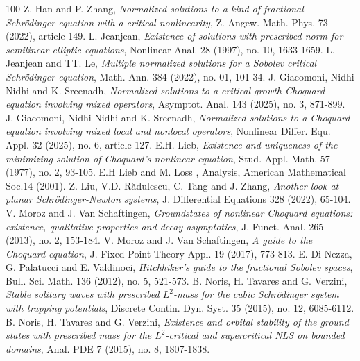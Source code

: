 \documentclass[11pt]{article}
\numberwithin{equation}{section}
\numberwithin{mytheorem}{section}
\begin{document}
\begin{thebibliography}{100}
					 Z. Han and P. Zhang, {\it Normalized solutions to a kind of fractional Schrödinger equation with a critical nonlinearity}, Z. Angew. Math. Phys. 73 (2022), article 149.
					  L. Jeanjean,  {\it Existence of solutions with prescribed norm for semilinear elliptic equations}, Nonlinear Anal. 28 (1997), no. 10, 1633-1659. 
					 L. Jeanjean and TT. Le, {\it Multiple normalized solutions for a Sobolev critical Schrödinger equation}, Math. Ann. 384 (2022), no. 01, 101-34.
					 J. Giacomoni, Nidhi Nidhi and K. Sreenadh, {\it Normalized solutions to a critical growth Choquard equation involving mixed operators}, Asymptot. Anal. 143 (2025), no. 3, 871-899.
					 J. Giacomoni, Nidhi Nidhi and K. Sreenadh, {\it Normalized solutions to a Choquard equation involving mixed local and nonlocal operators}, Nonlinear Differ. Equ. Appl. 32 (2025), no. 6, article 127.
					E.H. Lieb, {\it Existence and uniqueness of the minimizing solution of Choquard's nonlinear equation}, Stud. Appl. Math. 57 (1977), no. 2, 93-105.
					E.H Lieb and M. Loss , Analysis, American Mathematical Soc.14 (2001).	
					Z. Liu, V.D. R\u adulescu, C. Tang and J. Zhang, {\it Another look at planar Schrödinger-Newton systems}, J. Differential Equations 328 (2022), 65-104.   
					 V. Moroz and J. Van Schaftingen, {\it Groundstates of nonlinear Choquard equations: existence, qualitative properties and decay asymptotics}, J. Funct. Anal. 265 (2013), no. 2, 153-184.
					 V. Moroz and J. Van Schaftingen, {\it A guide to the Choquard equation}, J. Fixed Point Theory Appl. 19 (2017), 773-813.
					 E. Di Nezza, G. Palatucci and E. Valdinoci, {\it Hitchhiker's guide to the fractional Sobolev spaces}, Bull. Sci. Math. 136 (2012), no. 5, 521-573.
					B. Noris, H. Tavares and G. Verzini, {\it Stable solitary waves with prescribed $ L^ 2$-mass for the cubic Schrödinger system with trapping potentials}, Discrete Contin. Dyn. Syst. 35 (2015), no. 12, 6085-6112.
					B. Noris, H. Tavares and G. Verzini, {\it Existence and orbital stability of the ground states with prescribed mass for the $L^2$-critical and supercritical NLS on bounded domains}, Anal. PDE 7 (2015), no. 8, 1807-1838.

\end{thebibliography}
\end{document}
